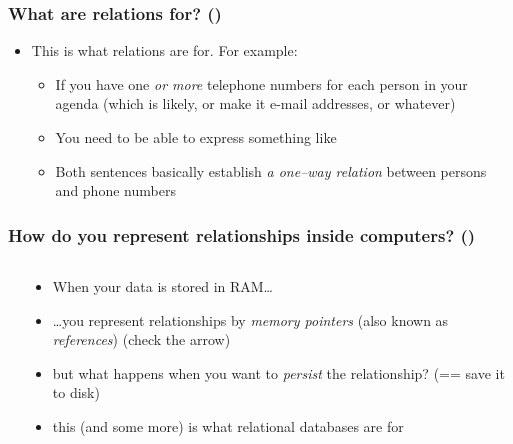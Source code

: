 \documentclass[\printmode,compress,xcolor=dvipsnames]{beamer}
\begin{document}
\begin{frame}
  \frametitle<+->{What are relations for? ()}

  \begin{itemize}[<+- | alert@+->]

    \item This is what relations are for. For example:

    \begin{itemize}[<+- | alert@+->]

      \item If you have one \emph{or more} telephone numbers for each person
              in your agenda (which is likely, or make it e-mail addresses, or whatever)


      \item You need to be able to express something like 

      \item Both sentences basically establish \emph{a one--way relation} between persons and
              phone numbers

    \end{itemize}
  \end{itemize}

\end{frame}

\setcounter{ms}{0}
\begin{frame}
 \frametitle<+->{How do you represent relationships inside computers?  ()}

 \begin{columns}[T]
   \begin{column}{\leftcolumn}
   \end{column}
   \begin{column}{\rightcolumn}
     \begin{itemize}[<+- | alert@+->]

        \item When your data is stored in RAM\dots

        \item \dots you represent relationships by \emph{memory pointers}
                (also known as \emph{references}) (check the arrow)

        \item but what happens when you want to \emph{persist}
                the relationship?
                (== save it to disk)

        \item this (and some more) is what relational databases are for

     \end{itemize}
   \end{column}
 \end{columns}
\end{frame}
\end{document}
